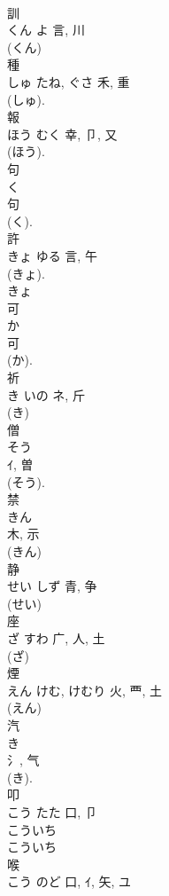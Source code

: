 \documentclass[8pt]{extreport}
\begin{document}
\begin{CJK}{UTF8}{min}
\\	訓	
\\	くん	よ	言, 川	
\\	(くん) 
\\	種	
\\	しゅ	たね, ぐさ	禾, 重	
\\	(しゅ). 
\\	報	
\\	ほう	むく	幸, 卩, 又	
\\	(ほう). 
\\	句	
\\	く	
\\	句	
\\	(く).	
\\	許	
\\	きょ	ゆる	言, 午	
\\	(きょ). 
\\	きょ 
\\	可	
\\	か	
\\	可	
\\	(か). 
\\	祈	
\\	き	いの	ネ, 斤	
\\	(き) 
\\	僧	
\\	そう	
\\	ｲ, 曽	
\\	(そう). 
\\	禁	
\\	きん	
\\	木, 示	
\\	(きん) 
\\	静	
\\	せい	しず	青, 争	
\\	(せい) 
\\	座	
\\	ざ	すわ	广, 人, 土	
\\	(ざ) 
\\	煙	
\\	えん	けむ, けむり	火, 覀, 土	
\\	(えん) 
\\	汽	
\\	き	
\\	氵, 气	
\\	(き). 
\\	叩	
\\	こう	たた	口, 卩	
\\	こういち 
\\	こういち 
\\	喉	
\\	こう	のど	口, ｲ, 矢, ユ	

\end{CJK}
\end{document}
